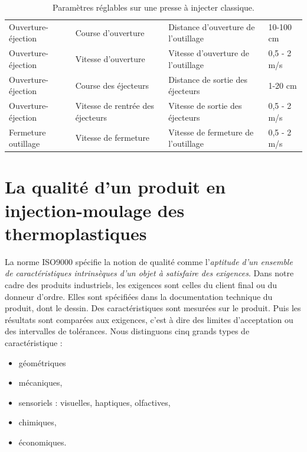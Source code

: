 \begin{table}[thbp]
\begin{tabular}{|llll|}
		Ouverture-éjection     & Course d'ouverture               & Distance d'ouverture de l'outillage                                       & 10-100 cm                      \\
		Ouverture-éjection     & Vitesse d'ouverture              & Vitesse d'ouverture de l'outillage                                        & 0,5 - 2 m/s                    \\
		Ouverture-éjection     & Course des éjecteurs             & Distance de sortie des éjecteurs                                      & 1-20 cm                        \\
		Ouverture-éjection     & Vitesse de rentrée des éjecteurs & Vitesse de sortie des éjecteurs                                                               & 0,5 - 2 m/s                    \\
		Fermeture outillage      & Vitesse de fermeture             & Vitesse de fermeture de l'outillage                                                           & 0,5 - 2 m/s                   \\
		\hline
	\end{tabular}%
	\caption{Paramètres réglables sur une presse à injecter classique.}
	\label{tab:process_parameters}
\end{table}


\newpage
\section{La qualité d'un produit en injection-moulage des thermoplastiques} \label{sec:quality_definition}

La norme ISO9000 \cite{ISO_9000_2015} spécifie la notion de qualité comme l'\textit{aptitude d'un ensemble de caractéristiques intrinsèques d'un objet à satisfaire des exigences}.
Dans notre cadre des produits industriels, les exigences sont celles du client final ou du donneur d'ordre.
Elles sont spécifiées dans la documentation technique du produit, dont le dessin.
Des caractéristiques sont mesurées sur le produit.
Puis les résultats sont comparées aux exigences, c'est à dire des limites d'acceptation ou des intervalles de tolérances.
Nous distinguons cinq grands types de caractéristique :
\begin{itemize}
	\item géométriques  %
	\item mécaniques,
	\item sensoriels : visuelles, haptiques, olfactives,
	\item chimiques,
	\item économiques.
\end{itemize}

